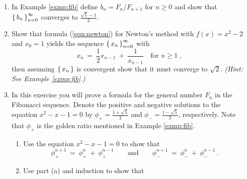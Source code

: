 {\begin{enumerate}[item-label={\bfseries \arabic*.}]
\par\noindent For Exercises 13-16 use a geometric progression to write the given
repeating decimal as a rational number.
[item-label={{[\bfseries \arabic*.]}}]
[item-label={{[\bfseries \arabic*.]}}]
 \item In Example \ref{exmp:fib} define $b_n = F_n/F_{n+1}$ for $n\ge 0$ and
 show that $\left\lbrace\mspace{3mu}b_n\mspace{3mu}\right\rbrace_{n=0}^{\infty}$ converges to $\frac{\sqrt{5}-1}{2}$.
 \item Show that formula (\ref{eqn:newton}) for Newton's method with
 $f(x) = x^2 - 2$ and $x_0 = 1$ yields the sequence $\left\lbrace\mspace{3mu}x_n\mspace{3mu}\right\rbrace_{n=0}^{\infty}$
 with
\[
x_n ~=~ \frac{1}{2} x_{n-1} ~+~ \frac{1}{x_{n-1}} \quad\text{for $n\ge 1\;$,}
\]
then assuming $\left\lbrace\mspace{3mu}x_n\mspace{3mu}\right\rbrace$ is convergent show that it must converge to
$\sqrt{2}$. \emph{(Hint: See Example \ref{exmp:fib}.)}
 \item In this exercise you will prove a formula for the general number $F_n$
  in the Fibonacci sequence. Denote the positive and negative solutions to the
  equation $x^2 - x - 1 = 0$ by $\phi_{+} = \frac{1+\sqrt{5}}{2}$ and
  $\phi_{-} = \frac{1-\sqrt{5}}{2}$, respectively. Note that $\phi_{+}$ is the
  golden ratio mentioned in Example \ref{exmp:fib}.
\begin{enumerate}[item-label={\bfseries (\alph*)}]
 \item Use the equation $x^2 - x - 1 = 0$ to show that
\[
\phi_{+}^{n+1} ~=~ \phi_{+}^{n} ~+~ \phi_{+}^{n-1} \qquad\text{and}\qquad
\phi_{-}^{n+1} ~=~ \phi_{-}^{n} ~+~ \phi_{-}^{n-1} ~.
\]
 \item Use part (a) and induction to show that

\end{enumerate}
\end{enumerate}}
